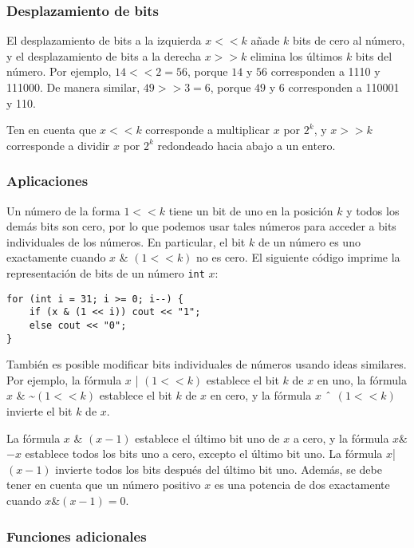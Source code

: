 \subsubsection{Desplazamiento de bits}


El desplazamiento de bits a la izquierda $x < < k$ añade $k$
bits de cero al número,
y el desplazamiento de bits a la derecha $x > > k$
elimina los últimos $k$ bits del número.
Por ejemplo, $14 < < 2 = 56$,
porque $14$ y $56$ corresponden a 1110 y 111000.
De manera similar, $49 > > 3 = 6$,
porque $49$ y $6$ corresponden a 110001 y 110.

Ten en cuenta que $x < < k$
corresponde a multiplicar $x$ por $2^k$,
y $x > > k$
corresponde a dividir $x$ por $2^k$
redondeado hacia abajo a un entero.

\subsubsection{Aplicaciones}

Un número de la forma $1 < < k$ tiene un bit de uno
en la posición $k$ y todos los demás bits son cero,
por lo que podemos usar tales números para acceder a bits individuales de los números.
En particular, el bit $k$ de un número es uno
exactamente cuando $x$ \& $(1 < < k)$ no es cero.
El siguiente código imprime la representación de bits
de un número \texttt{int} $x$:

\begin{lstlisting}
for (int i = 31; i >= 0; i--) {
    if (x & (1 << i)) cout << "1";
    else cout << "0";
}
\end{lstlisting}

También es posible modificar bits individuales
de números usando ideas similares.
Por ejemplo, la fórmula $x$ | $(1 < < k)$
establece el bit $k$ de $x$ en uno,
la fórmula
$x$ \& \textasciitilde $(1 < < k)$
establece el bit $k$ de $x$ en cero,
y la fórmula
$x$ $\XOR$ $(1 < < k)$
invierte el bit $k$ de $x$.

La fórmula $x$ \& $(x-1)$ establece el último
bit uno de $x$ a cero,
y la fórmula $x$\nobreakspace\&\nobreakspace$-x$ establece todos los
bits uno a cero, excepto el último bit uno.
La fórmula $x$\nobreakspace|\nobreakspace$(x-1)$
invierte todos los bits después del último bit uno.
Además, se debe tener en cuenta que un número positivo $x$ es
una potencia de dos exactamente cuando $x$\nobreakspace\&\nobreakspace$(x-1) = 0$.

\subsubsection*{Funciones adicionales}

